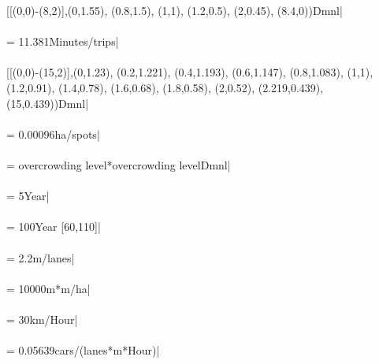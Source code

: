  [[(0,0)-(8,2)],(0,1.55), (0.8,1.5), (1,1), (1.2,0.5), (2,0.45), (8.4,0))Dmnl| \\ \\ 
 = 11.381Minutes/trips| \\ \\ 
 [[(0,0)-(15,2)],(0,1.23), (0.2,1.221), (0.4,1.193), (0.6,1.147), (0.8,1.083), (1,1), (1.2,0.91), (1.4,0.78), (1.6,0.68), (1.8,0.58), (2,0.52), (2.219,0.439), (15,0.439))Dmnl| \\ \\ 
 = 0.00096ha/spots| \\ \\ 
 = overcrowding level*overcrowding levelDmnl| \\ \\ 
 = 5Year| \\ \\ 
 = 100Year [60,110]| \\ \\ 
 = 2.2m/lanes| \\ \\ 
 = 10000m*m/ha| \\ \\ 
 = 30km/Hour| \\ \\ 
 = 0.05639cars/(lanes*m*Hour)| \\ \\ 
